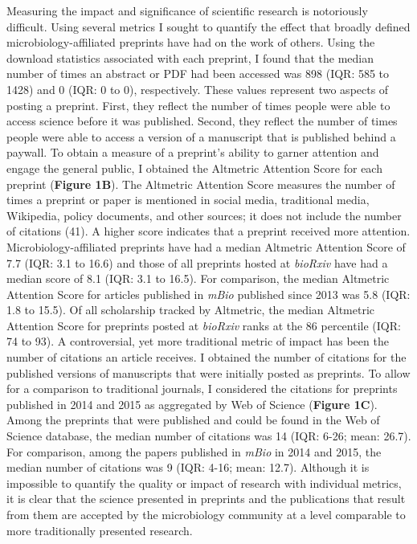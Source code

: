\documentclass[11pt,]{article}
\begin{document}
Measuring the impact and significance of scientific research is
notoriously difficult. Using several metrics I sought to quantify the
effect that broadly defined microbiology-affiliated preprints have had
on the work of others. Using the download statistics associated with
each preprint, I found that the median number of times an abstract or
PDF had been accessed was 898 (IQR: 585 to 1428) and 0 (IQR: 0 to 0),
respectively. These values represent two aspects of posting a preprint.
First, they reflect the number of times people were able to access
science before it was published. Second, they reflect the number of
times people were able to access a version of a manuscript that is
published behind a paywall. To obtain a measure of a preprint's ability
to garner attention and engage the general public, I obtained the
Altmetric Attention Score for each preprint (\textbf{Figure 1B}). The
Altmetric Attention Score measures the number of times a preprint or
paper is mentioned in social media, traditional media, Wikipedia, policy
documents, and other sources; it does not include the number of
citations (41). A higher score indicates that a preprint received more
attention. Microbiology-affiliated preprints have had a median Altmetric
Attention Score of 7.7 (IQR: 3.1 to 16.6) and those of all preprints
hosted at \emph{bioRxiv} have had a median score of 8.1 (IQR: 3.1 to
16.5). For comparison, the median Altmetric Attention Score for articles
published in \emph{mBio} published since 2013 was 5.8 (IQR: 1.8 to
15.5). Of all scholarship tracked by Altmetric, the median Altmetric
Attention Score for preprints posted at \emph{bioRxiv} ranks at the 86
percentile (IQR: 74 to 93). A controversial, yet more traditional metric
of impact has been the number of citations an article receives. I
obtained the number of citations for the published versions of
manuscripts that were initially posted as preprints. To allow for a
comparison to traditional journals, I considered the citations for
preprints published in 2014 and 2015 as aggregated by Web of Science
(\textbf{Figure 1C}). Among the preprints that were published and could
be found in the Web of Science database, the median number of citations
was 14 (IQR: 6-26; mean: 26.7). For comparison, among the papers
published in \emph{mBio} in 2014 and 2015, the median number of
citations was 9 (IQR: 4-16; mean: 12.7). Although it is impossible to
quantify the quality or impact of research with individual metrics, it
is clear that the science presented in preprints and the publications
that result from them are accepted by the microbiology community at a
level comparable to more traditionally presented research.
\end{document}
